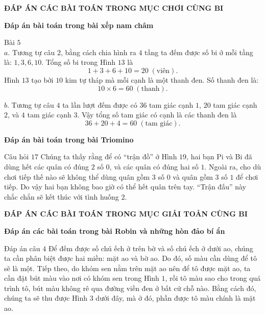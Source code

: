 \graphicspath{{../loigiai/pic/}}

\begin{center}
	\textbf{\color{toancuabi}ĐÁP ÁN CÁC BÀI TOÁN TRONG MỤC CHƠI CÙNG BI}
\end{center}
\begin{center}
	\textbf{\color{toancuabi}Đáp án bài toán trong bài xếp nam châm}
\end{center}
Bài $5$\\
$a.$	Tương tự câu $2$, bằng cách chia hình ra $4$ tầng ta đếm được số bi ở mỗi tầng là: $1,3,6,10$. Tổng số bi trong Hình $13$ là
$$1+3+6+10= 20 \;(\text{viên}).$$
Hình $13$ tạo bởi $10$ kim tự tháp mà mỗi cạnh là một thanh đen. Số thanh đen là: 
$$10\times 6=60 \;(\text{thanh}).$$

$b.$	Tương tự câu $4$ ta lần lượt đếm được có $36$ tam  giác cạnh $1$, $20$ tam giác cạnh $2$, và $4$ tam giác cạnh $3$. Vậy tổng số tam giác có cạnh là các thanh đen là 
$$36+20+4=60  \;(\text{tam giác}).$$
\begin{center}
	\textbf{\color{toancuabi}Đáp án bài toán trong bài Triomino}
\end{center}
Câu hỏi $17$\vskip 0.1cm
Chúng ta thấy rằng để có “trận đồ” ở Hình $19$, hai bạn Pi và Bi đã dùng hết các quân có đúng $2$ số $0$, và các quân có đúng hai số $1$. Ngoài ra, cho dù chơi tiếp thế nào sẽ không thể dùng quân gồm $3$ số $0$ và quân gồm $3$ số $1$ để chơi tiếp. Do vậy hai bạn không bao giờ có thể hết quân trên tay. “Trận đấu” này chắc chắn sẽ kết thúc với tình huống $2$.
\newpage
\newpage
\begin{center}
	\textbf{\color{toancuabi}ĐÁP ÁN CÁC BÀI TOÁN TRONG MỤC GIẢI TOẢN CÙNG BI}
\end{center}
\begin{center}
	\textbf{\color{toancuabi}Đáp án các bài toán trong bài Robin và những hòn đảo bí ẩn}
\end{center}
Đáp án câu $4$
\vskip 0.1cm
Để đếm được số chú ếch ở trên bờ và số chú ếch ở dưới ao, chúng ta cần phân biệt được hai miền: mặt ao và bờ ao. Do đó, số màu cần dùng để tô sẽ là một. Tiếp theo, do khóm sen nằm trên mặt ao nên để tô được mặt ao, ta cần đặt bút màu vào nơi có khóm sen trong Hình $1$, rồi tô màu sao cho trong quá trình tô, bút màu không rê qua đường viền đen ở bất cứ chỗ nào. Bằng cách đó, chúng ta sẽ thu được Hình $3$ dưới đây, mà ở đó, phần được tô màu chính là mặt ao. 
